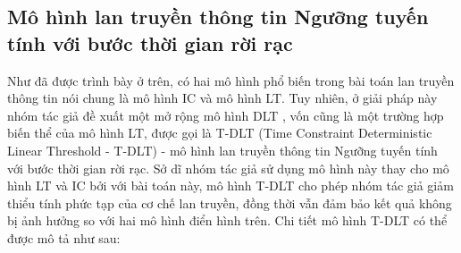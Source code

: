 \subsection{Mô hình lan truyền thông tin Ngưỡng tuyến tính với bước thời gian rời rạc}
Như đã được trình bày ở trên, có hai mô hình phổ biến trong bài toán lan truyền thông tin nói chung là mô hình IC và mô hình LT. Tuy nhiên, ở giải pháp này nhóm tác giả đề xuất một mở rộng mô hình DLT \cite{zaixin}, vốn cũng là một trường hợp biến thể của mô hình LT, được gọi là T-DLT (Time Constraint Deterministic Linear Threshold - T-DLT) - mô hình lan truyền thông tin Ngưỡng tuyến tính với bước thời gian rời rạc. Sở dĩ nhóm tác giả sử dụng mô hình này thay cho mô hình LT và IC bởi với bài toán này, mô hình T-DLT cho phép nhóm tác giả giảm thiểu tính phức tạp của cơ chế lan truyền, đồng thời vẫn đảm bảo kết quả không bị ảnh hưởng so với hai mô hình điển hình trên. Chi tiết mô hình T-DLT có thể được mô tả như sau:
